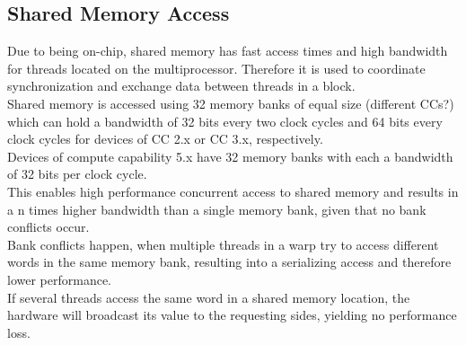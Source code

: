 \subsection{Shared Memory Access}
\label{sub:shared}
Due to being on-chip, shared memory has fast access times and high bandwidth for threads located on the multiprocessor. Therefore it is used to coordinate synchronization and exchange data between threads in a block.\\
Shared memory is accessed using 32 memory banks of equal size (different CCs?) which can hold a bandwidth of 32 bits every two clock cycles and 64 bits every clock cycles for devices of CC 2.x or CC 3.x, respectively.\\
Devices of compute capability 5.x have 32 memory banks with each a bandwidth of 32 bits per clock cycle.\\
This enables high performance concurrent access to shared memory and results in a n times higher bandwidth than a single memory bank, given that no bank conflicts occur.\\
Bank conflicts happen, when multiple threads in a warp try to access different words in the same memory bank, resulting into a serializing access and therefore lower performance.\\
If several threads access the same word in a shared memory location, the hardware will broadcast its value to the requesting sides, yielding no performance loss.\\

